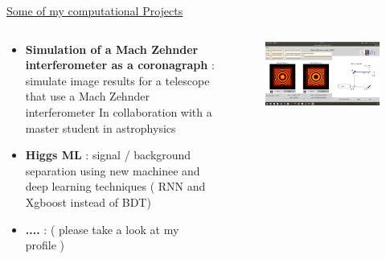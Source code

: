 \documentclass[11pt,aspectratio=169]{beamer}
\begin{document}
% 
 \begin{frame}{\underline{Some of my computational Projects} }
 	\begin{columns}
 		\begin{column}{0.5\linewidth}
 
 	\begin{itemize}			  \setlength\itemsep{1em}
 		
 			\item \textbf{Simulation of a Mach Zehnder interferometer as a coronagraph} : simulate image results for a telescope that use a Mach Zehnder interferometer  In collaboration with a master student in astrophysics
 		
 		\item \textbf{Higgs ML }: signal / background separation using new machinee and deep learning techniques ( RNN and Xgboost instead of BDT)
 		

 		
 		\item \textbf{....} : ( please take a look at my \faGithubSquare $ $ profile )
 		
  
 \end{itemize}
 		\end{column}
 
 		\begin{column}{0.5\linewidth}
 
 			
 
 			\begin{figure}[H]
 				\begin{center}
 					\includegraphics[width=\textwidth]{jamal}
 				\end{center}
 			\end{figure}
 		
 
 
 		\end{column}
 	\end{columns}
 
 \end{frame}
% 
\end{document}
